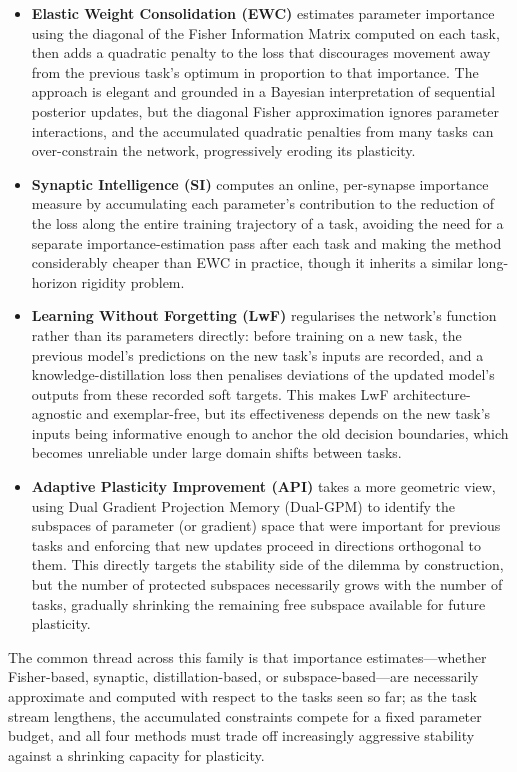 \begin{itemize}
	\item \textbf{Elastic Weight Consolidation (EWC)} \cite{Kirkpatrick_2017} estimates parameter importance using the diagonal of the Fisher Information Matrix computed on each task, then adds a quadratic penalty to the loss that discourages movement away from the previous task's optimum in proportion to that importance. The approach is elegant and grounded in a Bayesian interpretation of sequential posterior updates, but the diagonal Fisher approximation ignores parameter interactions, and the accumulated quadratic penalties from many tasks can over-constrain the network, progressively eroding its plasticity.
	\item \textbf{Synaptic Intelligence (SI)} \cite{zenke2017continuallearningsynapticintelligence} computes an online, per-synapse importance measure by accumulating each parameter's contribution to the reduction of the loss along the entire training trajectory of a task, avoiding the need for a separate importance-estimation pass after each task and making the method considerably cheaper than EWC in practice, though it inherits a similar long-horizon rigidity problem.
	\item \textbf{Learning Without Forgetting (LwF)} \cite{li2017learningforgetting} regularises the network's function rather than its parameters directly: before training on a new task, the previous model's predictions on the new task's inputs are recorded, and a knowledge-distillation loss then penalises deviations of the updated model's outputs from these recorded soft targets. This makes LwF architecture-agnostic and exemplar-free, but its effectiveness depends on the new task's inputs being informative enough to anchor the old decision boundaries, which becomes unreliable under large domain shifts between tasks.
	\item \textbf{Adaptive Plasticity Improvement (API)} \cite{API} takes a more geometric view, using Dual Gradient Projection Memory (Dual-GPM) to identify the subspaces of parameter (or gradient) space that were important for previous tasks and enforcing that new updates proceed in directions orthogonal to them. This directly targets the stability side of the dilemma by construction, but the number of protected subspaces necessarily grows with the number of tasks, gradually shrinking the remaining free subspace available for future plasticity.
\end{itemize}

The common thread across this family is that importance estimates---whether Fisher-based, synaptic, distillation-based, or subspace-based---are necessarily approximate and computed with respect to the tasks seen so far; as the task stream lengthens, the accumulated constraints compete for a fixed parameter budget, and all four methods must trade off increasingly aggressive stability against a shrinking capacity for plasticity.

